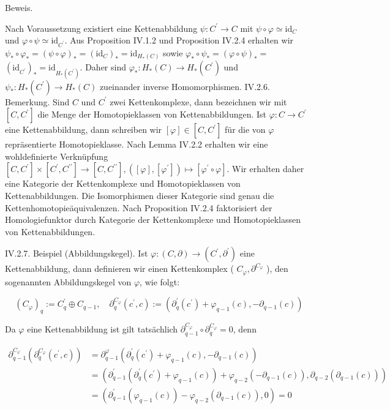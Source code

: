 \documentclass[10pt, letterpaper]{article}
\begin{document}
Beweis. 

Nach Voraussetzung existiert eine Kettenabbildung $\psi: C^{\prime} \rightarrow C$ mit $\psi \circ \varphi \simeq \mathrm{id}_C$ und $\varphi \circ \psi \simeq \mathrm{id}_{C^{\prime}}$. Aus Proposition IV.1.2 und Proposition IV.2.4 erhalten wir $\psi_* \circ \varphi_*=(\psi \circ \varphi)_*=\left(\mathrm{id}_C\right)_*=\mathrm{id}_{H_*(C)}$ sowie $\varphi_* \circ \psi_*=(\varphi \circ \psi)_*=$ $\left(\mathrm{id}_{C^{\prime}}\right)_*=\mathrm{id}_{H_*\left(C^{\prime}\right)}$. Daher sind $\varphi_*: H_*(C) \rightarrow H_*\left(C^{\prime}\right)$ und $\psi_*: H_*\left(C^{\prime}\right) \rightarrow H_*(C)$ zueinander inverse Homomorphismen.
IV.2.6. Bemerkung. Sind $C$ und $C^{\prime}$ zwei Kettenkomplexe, dann bezeichnen wir mit $\left[C, C^{\prime}\right]$ die Menge der Homotopieklassen von Kettenabbildungen. Ist $\varphi: C \rightarrow C^{\prime}$ eine Kettenabbildung, dann schreiben wir $[\varphi] \in\left[C, C^{\prime}\right]$ für die von $\varphi$ repräsentierte Homotopieklasse. Nach Lemma IV.2.2 erhalten wir eine wohldefinierte Verknüpfung $\left[C, C^{\prime}\right] \times\left[C^{\prime}, C^{\prime \prime}\right] \rightarrow\left[C, C^{\prime \prime}\right],\left([\varphi],\left[\varphi^{\prime}\right]\right) \mapsto\left[\varphi^{\prime} \circ \varphi\right]$. Wir erhalten daher eine Kategorie der Kettenkomplexe und Homotopieklassen von Kettenabbildungen. Die Isomorphismen dieser Kategorie sind genau die Kettenhomotopieäquivalenzen. Nach Proposition IV.2.4 faktorisiert der Homologiefunktor durch Kategorie der Kettenkomplexe und Homotopieklassen von Kettenabbildungen.

IV.2.7. Beispiel (Abbildungskegel). Ist $\varphi:(C, \partial) \rightarrow\left(C^{\prime}, \partial^{\prime}\right)$ eine Kettenabbildung, dann definieren wir einen Kettenkomplex ( $C_{\varphi}, \partial^{C_{\varphi}}$ ), den sogenannten Abbildungskegel von $\varphi$, wie folgt:

$$
\left(C_{\varphi}\right)_q:=C_q^{\prime} \oplus C_{q-1}, \quad \partial_q^{C_{\varphi}}\left(c^{\prime}, c\right):=\left(\partial_q^{\prime}\left(c^{\prime}\right)+\varphi_{q-1}(c),-\partial_{q-1}(c)\right)
$$


Da $\varphi$ eine Kettenabbildung ist gilt tatsächlich $\partial_{q-1}^{C_{\varphi}} \circ \partial_q^{C_{\varphi}}=0$, denn

$$
\begin{aligned}
\partial_{q-1}^{C_{\varphi}}\left(\partial_q^{C_{\varphi}}\left(c^{\prime}, c\right)\right) & =\partial_{q-1}^{\varphi}\left(\partial_q^{\prime}\left(c^{\prime}\right)+\varphi_{q-1}(c),-\partial_{q-1}(c)\right) \\
& =\left(\partial_{q-1}^{\prime}\left(\partial_q^{\prime}\left(c^{\prime}\right)+\varphi_{q-1}(c)\right)+\varphi_{q-2}\left(-\partial_{q-1}(c)\right), \partial_{q-2}\left(\partial_{q-1}(c)\right)\right) \\
& =\left(\partial_{q-1}^{\prime}\left(\varphi_{q-1}(c)\right)-\varphi_{q-2}\left(\partial_{q-1}(c)\right), 0\right)=0
\end{aligned}
$$
\end{document}
